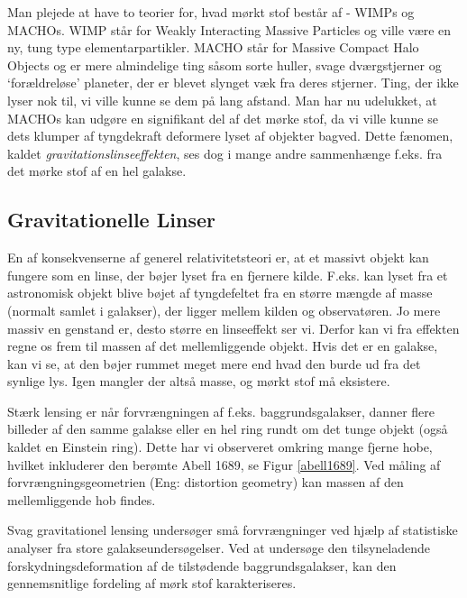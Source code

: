Man plejede at have to teorier for, hvad mørkt stof består af - WIMPs og MACHOs. WIMP står for Weakly Interacting Massive Particles og ville være en ny, tung type elementarpartikler. MACHO står for Massive Compact Halo Objects og er mere almindelige ting såsom sorte huller, svage dværgstjerner og `forældreløse' planeter, der er blevet slynget væk fra deres stjerner. Ting, der ikke lyser nok til, vi ville kunne se dem på lang afstand. Man har nu udelukket, at MACHOs kan udgøre en signifikant del af det mørke stof, da vi ville kunne se dets klumper af tyngdekraft deformere lyset af objekter bagved. Dette fænomen, kaldet \emph{gravitationslinseeffekten}, ses dog i mange andre sammenhænge f.eks. fra det mørke stof af en hel galakse. 

\iffalse
\subsection{Gravitationelle Linser}

En af konsekvenserne af generel relativitetsteori er, at et massivt objekt kan fungere som en linse, der bøjer lyset fra en fjernere kilde. F.eks. kan lyset fra et astronomisk objekt blive bøjet af tyngdefeltet fra en større mængde af masse (normalt samlet i galakser), der ligger mellem kilden og observatøren. Jo mere massiv en genstand er, desto større en linseeffekt ser vi. Derfor kan vi fra effekten regne os frem til massen af det mellemliggende objekt. Hvis det er en galakse, kan vi se, at den bøjer rummet meget mere end hvad den burde ud fra det synlige lys. Igen mangler der altså masse, og mørkt stof må eksistere.


Stærk lensing er når forvrængningen af f.eks. baggrundsgalakser, danner flere billeder af den samme galakse eller en hel ring rundt om det tunge objekt (også kaldet en Einstein ring). Dette har vi observeret omkring mange fjerne hobe, hvilket inkluderer den berømte Abell 1689, se Figur \ref{abell1689}. Ved måling af forvrængningsgeometrien (Eng: distortion geometry) kan massen af den mellemliggende hob findes. %

Svag gravitationel lensing undersøger små forvrængninger ved hjælp af statistiske analyser fra store galakseundersøgelser. Ved at undersøge den tilsyneladende forskydningsdeformation af de tilstødende baggrundsgalakser, kan den gennemsnitlige fordeling af mørk stof karakteriseres.

